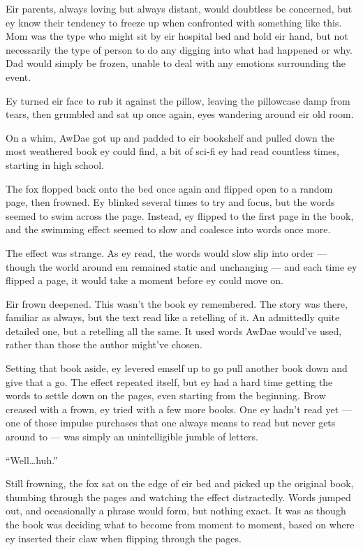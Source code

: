 Eir parents, always loving but always distant, would doubtless be concerned, but ey know their tendency to freeze up when confronted with something like this. Mom was the type who might sit by eir hospital bed and hold eir hand, but not necessarily the type of person to do any digging into what had happened or why. Dad would simply be frozen, unable to deal with any emotions surrounding the event.

Ey turned eir face to rub it against the pillow, leaving the pillowcase damp from tears, then grumbled and sat up once again, eyes wandering around eir old room.

On a whim, AwDae got up and padded to eir bookshelf and pulled down the most weathered book ey could find, a bit of sci-fi ey had read countless times, starting in high school.

The fox flopped back onto the bed once again and flipped open to a random page, then frowned. Ey blinked several times to try and focus, but the words seemed to swim across the page. Instead, ey flipped to the first page in the book, and the swimming effect seemed to slow and coalesce into words once more.

The effect was strange. As ey read, the words would slow slip into order --- though the world around em remained static and unchanging --- and each time ey flipped a page, it would take a moment before ey could move on.

Eir frown deepened. This wasn't the book ey remembered. The story was there, familiar as always, but the text read like a retelling of it. An admittedly quite detailed one, but a retelling all the same. It used words AwDae would've used, rather than those the author might've chosen.

Setting that book aside, ey levered emself up to go pull another book down and give that a go. The effect repeated itself, but ey had a hard time getting the words to settle down on the pages, even starting from the beginning. Brow creased with a frown, ey tried with a few more books. One ey hadn't read yet --- one of those impulse purchases that one always means to read but never gets around to --- was simply an unintelligible jumble of letters.

``Well\ldots{}huh.''

Still frowning, the fox sat on the edge of eir bed and picked up the original book, thumbing through the pages and watching the effect distractedly. Words jumped out, and occasionally a phrase would form, but nothing exact. It was as though the book was deciding what to become from moment to moment, based on where ey inserted their claw when flipping through the pages.

